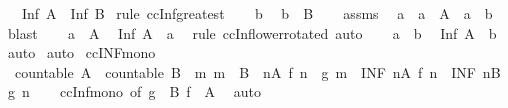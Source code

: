\begin{isabellebody}
\ \ \ {\isachardoublequoteopen}Inf\ A\ {\isasymle}\ Inf\ B{\isachardoublequoteclose}\isanewline
%
\isadelimproof
%
\endisadelimproof
%
\isatagproof
{}\isamarkupfalse%
\ {\isacharparenleft}rule\ ccInf{\isacharunderscore}greatest{\isacharparenright}\isanewline
\ \ \isamarkupfalse%
\ b\ \isamarkupfalse%
\ {\isachardoublequoteopen}b\ {\isasymin}\ B{\isachardoublequoteclose}\isanewline
\ \ \isamarkupfalse%
\ assms\ \isamarkupfalse%
\ a\ \ {\isachardoublequoteopen}a\ {\isasymin}\ A{\isachardoublequoteclose}\ \ {\isachardoublequoteopen}a\ {\isasymle}\ b{\isachardoublequoteclose}\ \isamarkupfalse%
\ blast\isanewline
\ \ \isamarkupfalse%
\ {\isacartoucheopen}a\ {\isasymin}\ A{\isacartoucheclose}\ \isamarkupfalse%
\ {\isachardoublequoteopen}Inf\ A\ {\isasymle}\ a{\isachardoublequoteclose}\ \isamarkupfalse%
\ {\isacharparenleft}rule\ ccInf{\isacharunderscore}lower{\isacharbrackleft}rotated{\isacharbrackright}{\isacharparenright}\ auto\isanewline
\ \ \isamarkupfalse%
\ {\isacartoucheopen}a\ {\isasymle}\ b{\isacartoucheclose}\ \isamarkupfalse%
\ {\isachardoublequoteopen}Inf\ A\ {\isasymle}\ b{\isachardoublequoteclose}\ \isamarkupfalse%
\ auto\isanewline
{}\isamarkupfalse%
\ auto%
\endisatagproof
{\isafoldproof}%
%
\isadelimproof
\isanewline
%
\endisadelimproof
\isanewline
{}\isamarkupfalse%
\ ccINF{\isacharunderscore}mono{\isacharcolon}\isanewline
\ \ {\isachardoublequoteopen}countable\ A\ {\isasymLongrightarrow}\ countable\ B\ {\isasymLongrightarrow}\ {\isacharparenleft}{\isasymAnd}m{\isachardot}\ m\ {\isasymin}\ B\ {\isasymLongrightarrow}\ {\isasymexists}n{\isasymin}A{\isachardot}\ f\ n\ {\isasymle}\ g\ m{\isacharparenright}\ {\isasymLongrightarrow}\ {\isacharparenleft}INF\ n{\isasymin}A{\isachardot}\ f\ n{\isacharparenright}\ {\isasymle}\ {\isacharparenleft}INF\ n{\isasymin}B{\isachardot}\ g\ n{\isacharparenright}{\isachardoublequoteclose}\isanewline
%
\isadelimproof
\ \ %
\endisadelimproof
%
\isatagproof
{}\isamarkupfalse%
\ ccInf{\isacharunderscore}mono\ {\isacharbrackleft}of\ {\isachardoublequoteopen}g\ {\isacharbackquote}\ B{\isachardoublequoteclose}\ {\isachardoublequoteopen}f\ {\isacharbackquote}\ A{\isachardoublequoteclose}{\isacharbrackright}\ \isamarkupfalse%
\ auto%
\endisatagproof
{\isafoldproof}%
%
\isadelimproof
\isanewline
%
\endisadelimproof

\end{isabellebody}

